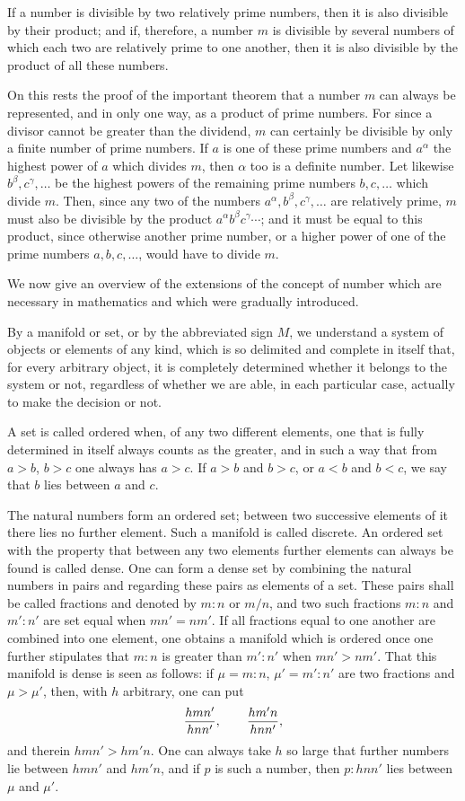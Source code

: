 \documentclass[11pt]{article}
\begin{document}
If a number is divisible by two relatively prime numbers, then it is also divisible by their product; and if, therefore, a number $m$ is divisible by several numbers of which each two are relatively prime to one another, then it is also divisible by the product of all these numbers.

On this rests the proof of the important theorem that a number $m$ can always be represented, and in only one way, as a product of prime numbers. For since a divisor cannot be greater than the dividend, $m$ can certainly be divisible by only a finite number of prime numbers. If $a$ is one of these prime numbers and $a^\alpha$ the highest power of $a$ which divides $m$, then $\alpha$ too is a definite number. Let likewise $b^\beta,c^\gamma,\ldots$ be the highest powers of the remaining prime numbers $b,c,\ldots$ which divide $m$. Then, since any two of the numbers $a^\alpha,b^\beta,c^\gamma,\ldots$ are relatively prime, $m$ must also be divisible by the product $a^\alpha b^\beta c^\gamma\cdots$; and it must be equal to this product, since otherwise another prime number, or a higher power of one of the prime numbers $a,b,c,\ldots$, would have to divide $m$.

We now give an overview of the extensions of the concept of number which are necessary in mathematics and which were gradually introduced.

By a manifold or set, or by the abbreviated sign $M$, we understand a system of objects or elements of any kind, which is so delimited and complete in itself that, for every arbitrary object, it is completely determined whether it belongs to the system or not, regardless of whether we are able, in each particular case, actually to make the decision or not.

A set is called ordered when, of any two different elements, one that is fully determined in itself always counts as the greater, and in such a way that from $a>b$, $b>c$ one always has $a>c$. If $a>b$ and $b>c$, or $a<b$ and $b<c$, we say that $b$ lies between $a$ and $c$.

The natural numbers form an ordered set; between two successive elements of it there lies no further element. Such a manifold is called discrete. An ordered set with the property that between any two elements further elements can always be found is called dense. One can form a dense set by combining the natural numbers in pairs and regarding these pairs as elements of a set. These pairs shall be called fractions and denoted by $m:n$ or $m/n$, and two such fractions $m:n$ and $m':n'$ are set equal when $mn'=nm'$. If all fractions equal to one another are combined into one element, one obtains a manifold which is ordered once one further stipulates that $m:n$ is greater than $m':n'$ when $mn'>nm'$. That this manifold is dense is seen as follows: if $\mu=m:n$, $\mu'=m':n'$ are two fractions and $\mu>\mu'$, then, with $h$ arbitrary, one can put
\[
 {hmn'\over hnn'},\qquad {hm'n\over hnn'},
\]
and therein $hmn'>hm'n$. One can always take $h$ so large that further numbers lie between $hmn'$ and $hm'n$, and if $p$ is such a number, then $p:hnn'$ lies between $\mu$ and $\mu'$.
\end{document}
